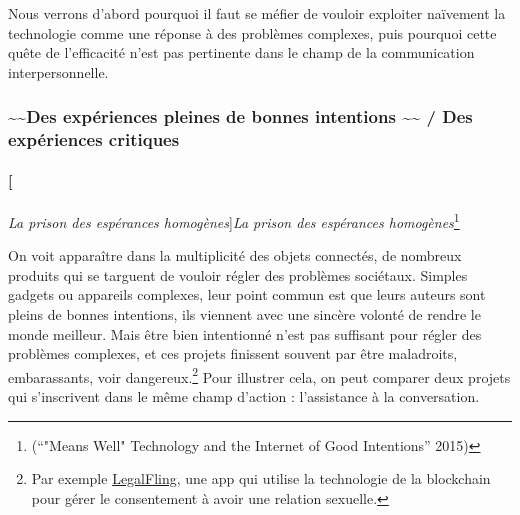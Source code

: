 \documentclass[]{article}
\let\oldparagraph\paragraph
\renewcommand{\paragraph}[1]{\oldparagraph{#1}\mbox{}}
\begin{document}
Nous verrons d'abord pourquoi il faut se méfier de vouloir exploiter
naïvement la technologie comme une réponse à des problèmes complexes,
puis pourquoi cette quête de l'efficacité n'est pas pertinente dans le
champ de la communication interpersonnelle.

\newpage

\hypertarget{des-expuxe9riences-pleines-de-bonnes-intentions-des-expuxe9riences-critiques}{%
\subsubsection{\textasciitilde{}\textasciitilde{}Des expériences pleines
de bonnes intentions \textasciitilde{}\textasciitilde{} / Des
expériences
critiques}\label{des-expuxe9riences-pleines-de-bonnes-intentions-des-expuxe9riences-critiques}}

\hypertarget{la-prison-des-espuxe9rances-homoguxe8nes-12b9}{%
\paragraph[\emph{La prison des espérances
homogènes}]{\texorpdfstring{\emph{La prison des espérances
homogènes}\footnote{(``"Means Well" Technology and the Internet of Good
  Intentions'' 2015)}}{La prison des espérances homogènes}}\label{la-prison-des-espuxe9rances-homoguxe8nes-12b9}}

On voit apparaître dans la multiplicité des objets connectés, de
nombreux produits qui se targuent de vouloir régler des problèmes
sociétaux. Simples gadgets ou appareils complexes, leur point commun est
que leurs auteurs sont pleins de bonnes intentions, ils viennent avec
une sincère volonté de rendre le monde meilleur. Mais être bien
intentionné n'est pas suffisant pour régler des problèmes complexes, et
ces projets finissent souvent par être maladroits, embarassants, voir
dangereux.\footnote{Par exemple
  \href{https://motherboard.vice.com/en_us/article/paqvn7/dont-fuck-anybody-who-wants-to-get-your-consent-uploaded-to-the-blockchain-legalfling-app}{LegalFling},
  une app qui utilise la technologie de la blockchain pour gérer le
  consentement à avoir une relation sexuelle.} Pour illustrer cela, on
peut comparer deux projets qui s'inscrivent dans le même champ d'action
: l'assistance à la conversation.
\end{document}
